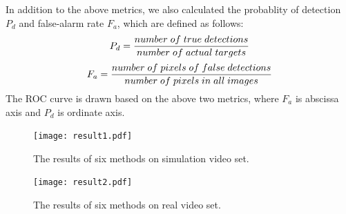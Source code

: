 \documentclass[journal]{IEEEtran}
\begin{document}
In addition to the above metrics, we also calculated the probablity of detection $P_d$ and false-alarm rate $F_a$, which are defined as follows:
\begin{equation}
  P_d=\frac{\mbox{number\;of\;true\;detections}}{\mbox{number\;of\;actual\;targets}}
\end{equation}
\begin{equation}
  F_a=\frac{\mbox{number\;of\;pixels\;of\;false\;detections}}{\mbox{number\;of\;pixels\;in\;all\;images}}
\end{equation}
The ROC curve is drawn based on the above two metrics, where $F_a$ is abscissa axis and $P_d$ is ordinate axis.


\begin{figure}
  \centering
  \texttt{[image: result1.pdf]}
  \caption{The results of six methods on simulation video set.}
  \label{result1}
\end{figure}

\begin{figure}
  \centering
  \texttt{[image: result2.pdf]}
  \caption{The results of six methods on real video set.}
  \label{result2}
\end{figure}
\end{document}
